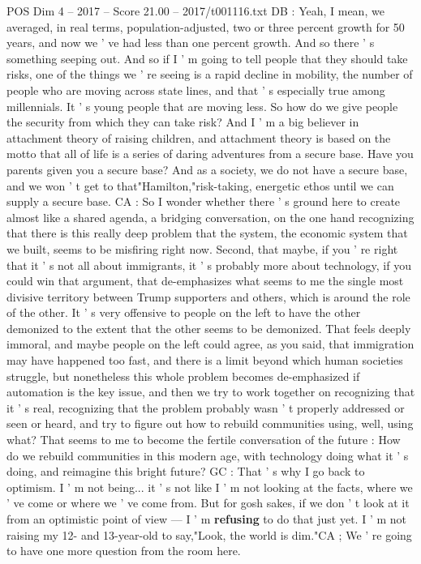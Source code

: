 \begin{textsample}{POS Dim 4 – 2017 – Score 21.00 – 2017/t001116.txt}
DB : Yeah, I mean, we averaged, in real terms, population-adjusted, two or three percent growth for 50 years, and now we ' ve had less than one percent growth.
And so there ' s something seeping out.
And so if I ' m going to tell people that they should take risks, one of the things we ' re seeing is a rapid decline in mobility, the number of people who are moving across state lines, and that ' s especially true among millennials.
It ' s young people that are moving less.
So how do we give people the security from which they can take risk?
And I ' m a big believer in attachment theory of raising children, and attachment theory is based on the motto that all of life is a series of daring adventures from a secure base.
Have you parents given you a secure base?
And as a society, we do not have a secure base, and we won ' t get to that"Hamilton,"risk-taking, energetic ethos until we can supply a secure base.
CA : So I wonder whether there ' s ground here to create almost like a shared agenda, a bridging conversation, on the one hand recognizing that there is this really deep problem that the system, the economic system that we built, seems to be misfiring right now.
Second, that maybe, if you ' re right that it ' s not all about immigrants, it ' s probably more about technology, if you could win that argument, that de-emphasizes what seems to me the single most divisive territory between Trump supporters and others, which is around the role of the other.
It ' s very offensive to people on the left to have the other demonized to the extent that the other seems to be demonized.
That feels deeply immoral, and maybe people on the left could agree, as you said, that immigration may have happened too fast, and there is a limit beyond which human societies struggle, but nonetheless this whole problem becomes de-emphasized if automation is the key issue, and then we try to work together on recognizing that it ' s real, recognizing that the problem probably wasn ' t properly addressed or seen or heard, and try to figure out how to rebuild communities using, well, using what?
That seems to me to become the fertile conversation of the future : How do we rebuild communities in this modern age, with technology doing what it ' s doing, and reimagine this bright future?
GC : That ' s why I go back to optimism.
I ' m not being... it ' s not like I ' m not looking at the facts, where we ' ve come or where we ' ve come from.
But for gosh sakes, if we don ' t look at it from an optimistic point of view — I ' m \textbf{refusing} to do that just yet.
I ' m not raising my 12- and 13-year-old to say,"Look, the world is dim."CA ; We ' re going to have one more question from the room here.

\end{textsample}
